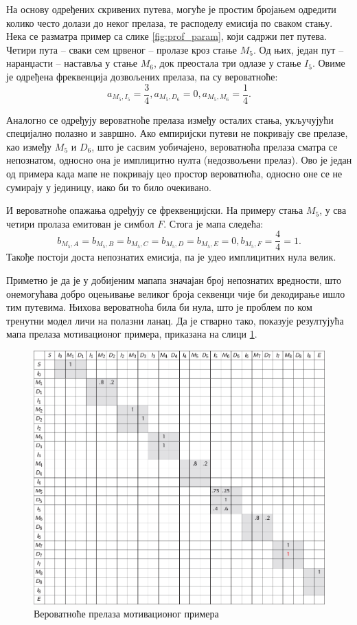 \documentclass[12pt,oneside]{memoir}
\begin{document}
\begin{CJK}{UTF8}{ipxm}
На основу одређених скривених путева, могуће је простим бројањем одредити колико често долази до неког прелаза, те расподелу емисија по сваком стању. Нека се разматра пример са слике \ref{fig:prof_param}, који садржи пет путева. Четири пута -- сваки сем црвеног -- пролазе кроз стање $M_5$. Од њих, један пут -- наранџасти -- наставља у стање $M_6$, док преостала три одлазе у стање $I_5$. Овиме је одређена фреквенција дозвољених прелаза, па су вероватноће: $$a_{M_5, I_5} = \frac{3}{4}, a_{M_5, D_6} = 0, a_{M_5, M_6} = \frac{1}{4}.$$

Аналогно се одређују вероватноће прелаза између осталих стања, укључујући специјално полазно и завршно. Ако емпиријски путеви не покривају све прелазе, као између $M_5$ и $D_6$, што је сасвим уобичајено, вероватноћа прелаза сматра се непознатом, односно она је имплицитно нулта (недозвољени прелаз). Ово је један од примера када мапе не покривају цео простор вероватноћа, односно оне се не сумирају у јединицу, иако би то било очекивано.

И вероватноће опажања одређују се фреквенцијски. На примеру стања $M_5$, у сва четири пролаза емитован је симбол $F$. Стога је мапа следећа: $$b_{M_5, A} = b_{M_5, B} = b_{M_5, C} = b_{M_5, D}= b_{M_5, E} = 0, b_{M_5, F} = \frac{4}{4} = 1.$$ Такође постоји доста непознатих емисија, па је удео имплицитних нула велик.

Приметно је да је у добијеним мапапа значајан број непознатих вредности, што онемогућава добро оцењивање великог броја секвенци чије би декодирање ишло тим путевима. Њихова вероватноћа била би нула, што је проблем по ком тренутни модел личи на полазни ланац. Да је стварно тако, показује резултујућа мапа прелаза мотивационог примера, приказана на слици \ref{fig:prelazi}.

\begin{figure}[H]
  \centering
  \includegraphics[width=\textwidth]{prelazi.png}
  \caption{Вероватноће прелаза мотивационог примера \cite{compeau2015}}
  \label{fig:prelazi}
\end{figure}


\end{CJK}
\end{document}
